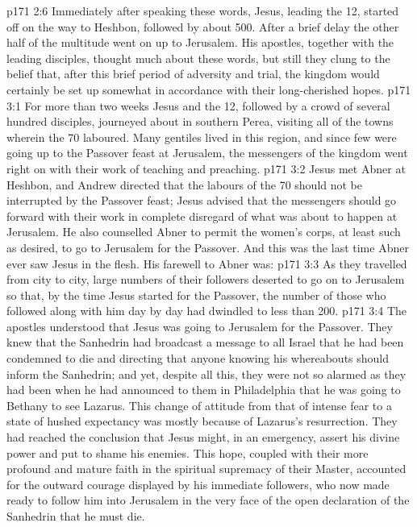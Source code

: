 \vs p171 2:6 \pc Immediately after speaking these words, Jesus, leading the 12, started off on the way to Heshbon, followed by about 500. After a brief delay the other half of the multitude went on up to Jerusalem. His apostles, together with the leading disciples, thought much about these words, but still they clung to the belief that, after this brief period of adversity and trial, the kingdom would certainly be set up somewhat in accordance with their long\hyp{}cherished hopes.
\vs p171 3:1 For more than two weeks Jesus and the 12, followed by a crowd of several hundred disciples, journeyed about in southern Perea, visiting all of the towns wherein the 70 laboured. Many gentiles lived in this region, and since few were going up to the Passover feast at Jerusalem, the messengers of the kingdom went right on with their work of teaching and preaching.
\vs p171 3:2 Jesus met Abner at Heshbon, and Andrew directed that the labours of the 70 should not be interrupted by the Passover feast; Jesus advised that the messengers should go forward with their work in complete disregard of what was about to happen at Jerusalem. He also counselled Abner to permit the women’s corps, at least such as desired, to go to Jerusalem for the Passover. And this was the last time Abner ever saw Jesus in the flesh. His farewell to Abner was: 
\vs p171 3:3 As they travelled from city to city, large numbers of their followers deserted to go on to Jerusalem so that, by the time Jesus started for the Passover, the number of those who followed along with him day by day had dwindled to less than 200.
\vs p171 3:4 The apostles understood that Jesus was going to Jerusalem for the Passover. They knew that the Sanhedrin had broadcast a message to all Israel that he had been condemned to die and directing that anyone knowing his whereabouts should inform the Sanhedrin; and yet, despite all this, they were not so alarmed as they had been when he had announced to them in Philadelphia that he was going to Bethany to see Lazarus. This change of attitude from that of intense fear to a state of hushed expectancy was mostly because of Lazarus’s resurrection. They had reached the conclusion that Jesus might, in an emergency, assert his divine power and put to shame his enemies. This hope, coupled with their more profound and mature faith in the spiritual supremacy of their Master, accounted for the outward courage displayed by his immediate followers, who now made ready to follow him into Jerusalem in the very face of the open declaration of the Sanhedrin that he must die.

